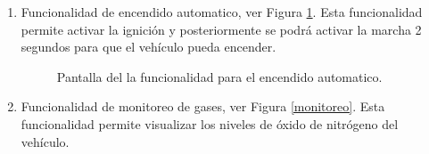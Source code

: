 \begin{enumerate}
\item Funcionalidad de encendido automatico, ver Figura \ref{encendido}. Esta funcionalidad permite activar la ignición y posteriormente se podrá activar la marcha 2 segundos para que el vehículo pueda encender.
\begin{figure}[H]
\centering
{}\hspace{5mm}
\hspace{5mm}
\caption{Pantalla del la funcionalidad para el encendido automatico.}
\label{encendido}
\end{figure}

\item Funcionalidad de monitoreo de gases, ver Figura \ref{monitoreo}. Esta funcionalidad permite visualizar los niveles de óxido de nitrógeno del vehículo.


\end{enumerate}
